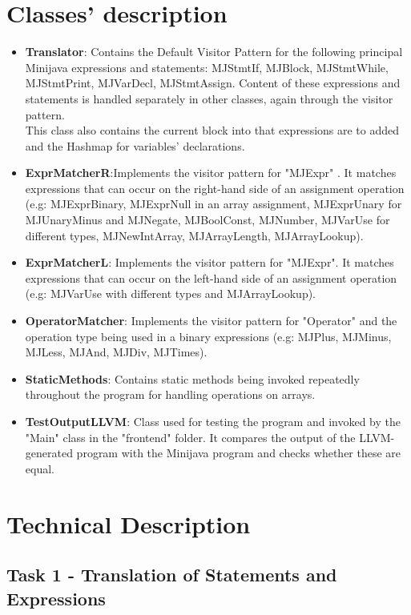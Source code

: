 \documentclass[paper=a4, fontsize=11pt]{scrartcl}
\numberwithin{equation}{section}		%
\numberwithin{figure}{section}			%
\numberwithin{table}{section}				%
\begin{document}
\section*{Classes' description}
\begin{itemize}
	\item \textbf{Translator}: Contains the Default Visitor Pattern for the following principal Minijava expressions and statements: MJStmtIf, MJBlock, MJStmtWhile, MJStmtPrint, MJVarDecl, MJStmtAssign. Content of these expressions and statements is handled separately in other classes, again through the visitor pattern. \\ This class also contains the current block into that expressions are to added and the Hashmap for variables' declarations.
	\item \textbf{ExprMatcherR}:Implements the visitor pattern for "MJExpr" . It matches expressions that can occur on the right-hand side of an assignment operation (e.g: MJExprBinary, MJExprNull in an array assignment, MJExprUnary for MJUnaryMinus and MJNegate, MJBoolConst, MJNumber, MJVarUse for different types, MJNewIntArray, MJArrayLength, MJArrayLookup). 
	\item \textbf{ExprMatcherL}: Implements the visitor pattern for "MJExpr". It matches expressions that can occur on the left-hand side of an assignment operation (e.g: MJVarUse with different types and MJArrayLookup). 
	\item \textbf{OperatorMatcher}: Implements the visitor pattern for "Operator" and the operation type being used in a binary expressions (e.g: MJPlus, MJMinus, MJLess, MJAnd, MJDiv, MJTimes). 
	\item \textbf{StaticMethods}: Contains static methods being invoked repeatedly throughout the program for handling operations on arrays. 
	\item \textbf{TestOutputLLVM}: Class used for testing the program and invoked by the "Main" class in the "frontend" folder. It compares the output of the LLVM-generated program with the Minijava program and checks whether these are equal. 
\end{itemize}

\section*{Technical Description}

\subsection*{Task 1 - Translation of Statements and Expressions}
\end{document}
